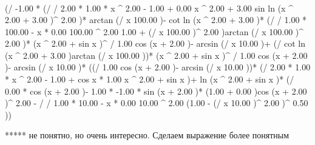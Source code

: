 \begin{gather}
\end{gather}
\begin{}
(/ {-1.00 * (/ {/ {2.00 * 1.00 * x ^ {2.00 - 1.00 }+ 0.00 }{x ^ {2.00 }+ 3.00 }}{sin ln (x ^ {2.00 }+ 3.00 )^ {2.00 }})* arctan (/ {x }{100.00 })- cot ln (x ^ {2.00 }+ 3.00 )* (/ {/ {1.00 * 100.00 - x * 0.00 }{100.00 ^ {2.00 }}}{1.00 + (/ {x }{100.00 })^ {2.00 }})}{arctan (/ {x }{100.00 })^ {2.00 }})* (x ^ {2.00 }+ sin x )^ {/ {1.00 }{cos (x + 2.00 )}- arcsin (/ {x }{10.00 })}+ (/ {cot ln (x ^ {2.00 }+ 3.00 )}{arctan (/ {x }{100.00 })})* (x ^ {2.00 }+ sin x )^ {/ {1.00 }{cos (x + 2.00 )}- arcsin (/ {x }{10.00 })}* ((/ {1.00 }{cos (x + 2.00 )}- arcsin (/ {x }{10.00 }))* (/ {2.00 * 1.00 * x ^ {2.00 - 1.00 }+ cos x * 1.00 }{x ^ {2.00 }+ sin x })+ ln (x ^ {2.00 }+ sin x )* (/ {0.00 * cos (x + 2.00 )- 1.00 * -1.00 * sin (x + 2.00 )* (1.00 + 0.00 )}{cos (x + 2.00 )^ {2.00 }}- / {/ {1.00 * 10.00 - x * 0.00 }{10.00 ^ {2.00 }}}{(1.00 - (/ {x }{10.00 })^ {2.00 })^ {0.50 }}))\\
\end{}
***** не понятно, но очень интересно. Сделаем выражение более понятным
